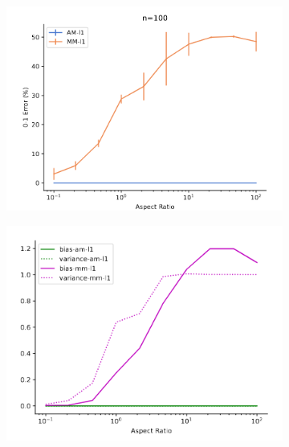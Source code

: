 \begin{figure}[t]
  \centering
  \begin{subfigure}[t]{0.24\linewidth}
    \centering
    \includegraphics[width=\columnwidth]{figures/estim_err_s1.png}
    \label{fig:estim_err_s1}
    \caption{}
  \end{subfigure}
  \hfill
  \begin{subfigure}[t]{0.24\linewidth}
    \centering
    \includegraphics[width=\columnwidth]{figures/bias_variance_s1.png}
    \label{fig:bias_variance_s1}
    \caption{}
  \end{subfigure}
  \hfill
  \begin{subfigure}[t]{0.24\linewidth}
    \centering

\end{subfigure}
\end{figure}
